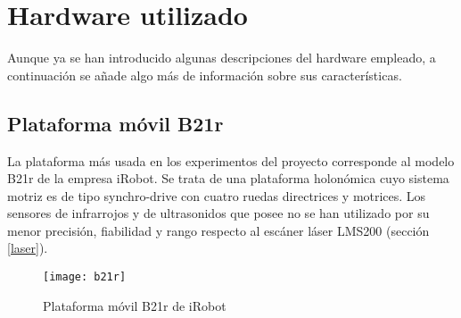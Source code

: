
\chapter{Hardware utilizado}\label{hardware}
Aunque ya se han introducido algunas descripciones del hardware empleado, a continuación se añade algo más de información sobre sus características.

\section{Plataforma móvil B21r}
La plataforma más usada en los experimentos del proyecto corresponde al modelo B21r de la empresa iRobot. Se trata de una plataforma holonómica cuyo sistema motriz es de tipo synchro-drive con cuatro ruedas directrices y motrices. Los sensores de infrarrojos y de ultrasonidos que posee no se han utilizado por su menor precisión, fiabilidad y rango respecto al escáner láser LMS200 (sección \ref{laser}).

\begin{figure}[h]
  \centering\texttt{[image: b21r]}\\
  \caption{Plataforma móvil B21r de iRobot}\label{fg:b21r}
\end{figure}

